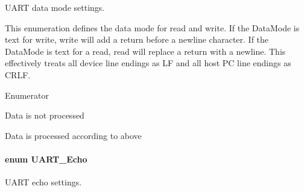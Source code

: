 U\-A\-R\-T data mode settings. 

This enumeration defines the data mode for read and write. If the Data\-Mode is text for write, write will add a return before a newline character. If the Data\-Mode is text for a read, read will replace a return with a newline. This effectively treats all device line endings as L\-F and all host P\-C line endings as C\-R\-L\-F. \begin{Desc}
\item[Enumerator]\par
\begin{description}
\item[{\em 
U\-A\-R\-T\-\_\-\-D\-A\-T\-A\-\_\-\-B\-I\-N\-A\-R\-Y\label{_u_a_r_t_8h_a694090fdb166f94ac30b809f9cba87b8aaa8edcbf6c236b0d86491ea1e7c9e4d8}
}]Data is not processed \item[{\em 
U\-A\-R\-T\-\_\-\-D\-A\-T\-A\-\_\-\-T\-E\-X\-T\label{_u_a_r_t_8h_a694090fdb166f94ac30b809f9cba87b8a87fdfb7ca981eab7f56c51380fd7094e}
}]Data is processed according to above \end{description}
\end{Desc}
\paragraph[{U\-A\-R\-T\-\_\-\-Echo}]{\setlength{\rightskip}{0pt plus 5cm}enum {\bf U\-A\-R\-T\-\_\-\-Echo}}\label{_u_a_r_t_8h_aac6a03c2e1d76f53e1d9d923dcdc24f2}


U\-A\-R\-T echo settings. 

